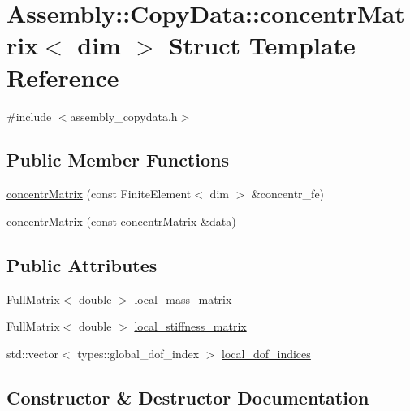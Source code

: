 \hypertarget{struct_assembly_1_1_copy_data_1_1concentr_matrix}{}\section{Assembly\+:\+:Copy\+Data\+:\+:concentr\+Matrix$<$ dim $>$ Struct Template Reference}
\label{struct_assembly_1_1_copy_data_1_1concentr_matrix}


{\ttfamily \#include $<$assembly\+\_\+copydata.\+h$>$}

\subsection*{Public Member Functions}
\begin{DoxyCompactItemize}
\item 
\hyperlink{struct_assembly_1_1_copy_data_1_1concentr_matrix_a3a79ebd7ee4093e8e06ee9ef0757596a}{concentr\+Matrix} (const Finite\+Element$<$ dim $>$ \&concentr\+\_\+fe)
\item 
\hyperlink{struct_assembly_1_1_copy_data_1_1concentr_matrix_a556e73863e274fc87366b661c0b8c2cb}{concentr\+Matrix} (const \hyperlink{struct_assembly_1_1_copy_data_1_1concentr_matrix}{concentr\+Matrix} \&data)
\end{DoxyCompactItemize}
\subsection*{Public Attributes}
\begin{DoxyCompactItemize}
\item 
Full\+Matrix$<$ double $>$ \hyperlink{struct_assembly_1_1_copy_data_1_1concentr_matrix_ac9d3fa147044cb330edcbfb28c9a51d8}{local\+\_\+mass\+\_\+matrix}
\item 
Full\+Matrix$<$ double $>$ \hyperlink{struct_assembly_1_1_copy_data_1_1concentr_matrix_ae611593ae75fc8317c368c54443a63f8}{local\+\_\+stiffness\+\_\+matrix}
\item 
std\+::vector$<$ types\+::global\+\_\+dof\+\_\+index $>$ \hyperlink{struct_assembly_1_1_copy_data_1_1concentr_matrix_a0388e1a38666197f44bfe6c39d95f6c6}{local\+\_\+dof\+\_\+indices}
\end{DoxyCompactItemize}


\subsection{Constructor \& Destructor Documentation}
\hypertarget{struct_assembly_1_1_copy_data_1_1concentr_matrix_a3a79ebd7ee4093e8e06ee9ef0757596a}{}
